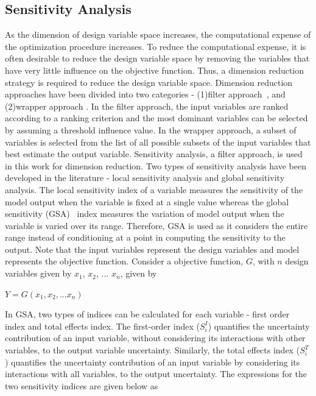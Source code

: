 \documentclass[10pt]{article}
\begin{document}
\subsection{Sensitivity Analysis}
\label{subsec:Sensitivity}
\hspace{5 mm} As the dimension of design variable space increases, the computational expense of the optimization procedure increases. To reduce the computational expense, it is often desirable to reduce the design variable space by removing the variables that have very little influence on the objective function. Thus, a dimension reduction strategy is required to reduce the design variable space. Dimension reduction approaches have been divided into two categories - (1)filter approach~\cite{Bioinformatics}, and (2)wrapper approach \cite{Wrappers}. In the filter approach, the input variables are ranked according to a ranking criterion and the most dominant variables can be selected by assuming a threshold influence value. In the wrapper approach, a subset of variables is selected from the list of all possible subsets of the input variables that best estimate the output variable. Sensitivity analysis, a filter approach, is used in this work for dimension reduction. Two types of sensitivity analysis have been developed in the literature - local sensitivity analysis and global sensitivity analysis. The local sensitivity index of a variable measures the sensitivity of the model output when the variable is fixed at a single value whereas the global sensitivity (GSA)~\cite{Global} index measures the variation of model output when the variable is varied over its range. Therefore, GSA is used as it considers the entire range instead of conditioning at a point in computing the sensitivity to the output. Note that the input variables represent the design variables and model represents the objective function.
Consider a objective function, $G$, with $n$ design variables given by $x_{1}$, $x_{2}$, ...  $x_{n}$, given by

\centerline{$Y = G(x_{1}, x_{2}, ... x_{n})$}

In GSA, two types of indices can be calculated for each variable - first order index and total effects index. The first-order index ($S_{i}^{I}$) quantifies the uncertainty contribution of an input variable, without considering its interactions with other variables, to the output variable uncertainty. Similarly, the total effects index ($S_{i}^{T}$) quantifies the uncertainty contribution of an input variable by considering its interactions with all variables, to the output uncertainty. The expressions for the two sensitivity indices are given below as 
\end{document}
